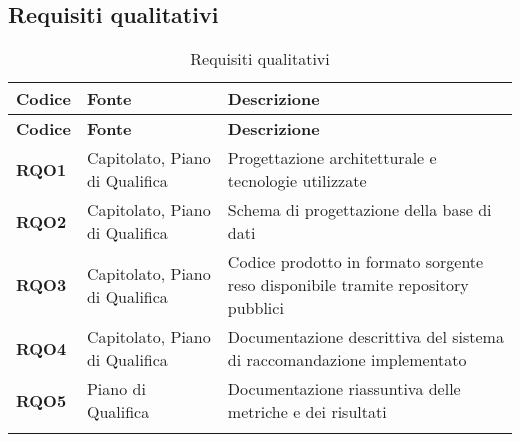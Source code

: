 \subsection{Requisiti qualitativi}
\begin{longtable}{|>{\centering\arraybackslash}m{}|>{\centering\arraybackslash}m{}|>{\centering\arraybackslash}m{}|}
	\hline
	\textbf{Codice} & \textbf{Fonte} & \textbf{Descrizione}\\\hline
	\endfirsthead
	\hline
	\textbf{Codice} & \textbf{Fonte} & \textbf{Descrizione}\\\hline
	\endhead
	\hline
	\textbf{RQO1} & Capitolato, Piano di Qualifica & Progettazione architetturale e tecnologie utilizzate \\
	\hline
	\textbf{RQO2} & Capitolato, Piano di Qualifica & Schema di progettazione della base di dati \\
	\hline
	\textbf{RQO3} & Capitolato, Piano di Qualifica & Codice prodotto in formato sorgente reso disponibile tramite repository pubblici \\
	\hline
	\textbf{RQO4} & Capitolato, Piano di Qualifica & Documentazione descrittiva del sistema di raccomandazione implementato\\
	\hline
	\textbf{RQO5} & Piano di Qualifica & Documentazione riassuntiva delle metriche e dei risultati\\
	\hline
	\caption{Requisiti qualitativi}
\end{longtable}

\pagebreak
